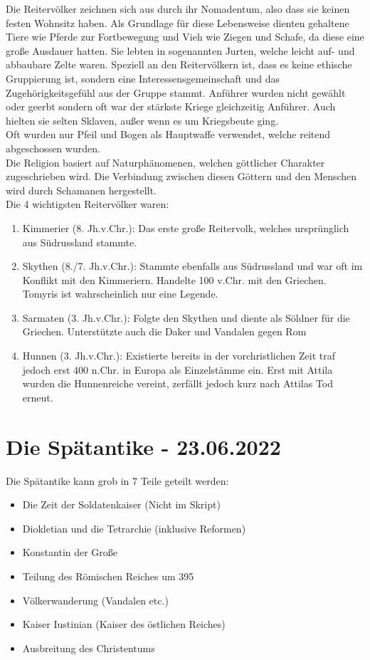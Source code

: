 \documentclass{article}
\begin{document}
	Die Reitervölker zeichnen sich aus durch ihr Nomadentum, also dass sie keinen festen Wohnsitz haben. Als Grundlage für diese Lebensweise dienten gehaltene Tiere wie Pferde zur Fortbewegung und Vieh wie Ziegen und Schafe, da diese eine große Ausdauer hatten. Sie lebten in sogenannten Jurten, welche leicht auf- und abbaubare Zelte waren. Speziell an den Reitervölkern ist, dass es keine ethische Gruppierung ist, sondern eine Interessensgemeinschaft und das Zugehörigkeitsgefühl aus der Gruppe stammt. Anführer wurden nicht gewählt oder geerbt sondern oft war der stärkste Kriege gleichzeitig Anführer. Auch hielten sie selten Sklaven, außer wenn es um Kriegsbeute ging. \\
	Oft wurden nur Pfeil und Bogen als Hauptwaffe verwendet, welche reitend abgeschossen wurden. \\
	Die Religion basiert auf Naturphänomenen, welchen göttlicher Charakter zugeschrieben wird. Die Verbindung zwischen diesen Göttern und den Menschen wird durch Schamanen hergestellt. \\
	Die 4 wichtigsten Reitervölker waren:
	\begin{enumerate}
		\item{Kimmerier (8. Jh.v.Chr.): Das erste große Reitervolk, welches ursprünglich aus Südrussland stammte.}
		\item{Skythen (8./7. Jh.v.Chr.): Stammte ebenfalls aus Südrussland und war oft im Konflikt mit den Kimmeriern. Handelte 100 v.Chr. mit den Griechen. Tomyris ist wahrscheinlich nur eine Legende.}
		\item{Sarmaten (3. Jh.v.Chr.): Folgte den Skythen und diente als Söldner für die Griechen. Unterstützte auch die Daker und Vandalen gegen Rom}
		\item{Hunnen (3. Jh.v.Chr.): Existierte bereits in der vorchristlichen Zeit traf jedoch erst 400 n.Chr. in Europa als Einzelstämme ein. Erst mit Attila wurden die Hunnenreiche vereint, zerfällt jedoch kurz nach Attilas Tod erneut.}
	\end{enumerate}

	\section{Die Spätantike - 23.06.2022}
	
	Die Spätantike kann grob in 7 Teile geteilt werden:
	\begin{itemize}
		\item{Die Zeit der Soldatenkaiser (Nicht im Skript)}
		\item{Diokletian und die Tetrarchie (inklusive Reformen)}
		\item{Konstantin der Große}
		\item{Teilung des Römischen Reiches um 395}
		\item{Völkerwanderung (Vandalen etc.)}
		\item{Kaiser Iustinian (Kaiser des östlichen Reiches)}
		\item{Ausbreitung des Christentums}
	\end{itemize}
\end{document}
